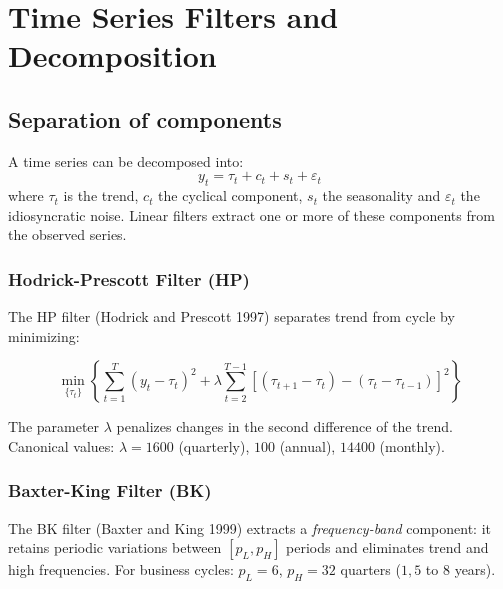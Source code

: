 \chapter{Time Series Filters and Decomposition}
\label{cap:filtros}

\section{Separation of components}

A time series can be decomposed into:
\[
  y_t = \tau_t + c_t + s_t + \varepsilon_t
\]
where $\tau_t$ is the trend, $c_t$ the cyclical component, $s_t$ the
seasonality and $\varepsilon_t$ the idiosyncratic noise. Linear filters
extract one or more of these components from the observed series.

\subsection*{Hodrick-Prescott Filter (HP)}

The HP filter (Hodrick and Prescott 1997) separates trend from cycle by minimizing:

\[
  \min_{\{\tau_t\}} \left\{ \sum_{t=1}^T (y_t - \tau_t)^2
  + \lambda \sum_{t=2}^{T-1} [(\tau_{t+1} - \tau_t) - (\tau_t - \tau_{t-1})]^2 \right\}
\]

The parameter $\lambda$ penalizes changes in the second difference of the trend.
Canonical values: $\lambda = 1600$ (quarterly), $100$ (annual), $14400$ (monthly).

\subsection*{Baxter-King Filter (BK)}

The BK filter (Baxter and King 1999) extracts a \emph{frequency-band} component:
it retains periodic variations between $[p_L, p_H]$ periods and eliminates
trend and high frequencies. For business cycles:
$p_L = 6$, $p_H = 32$ quarters ($1{,}5$ to $8$ years).

